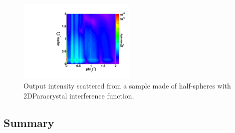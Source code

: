 \begin{figure}[tb]
\begin{center}
\includegraphics[angle=-90,width=0.5\textwidth]{fig/gisasmap/HSphere_2DDL.pdf}
\end{center}
\caption{Output intensity scattered from a sample made of half-spheres with 2DParacrystal interference function.}
\label{fig:2ddl}
\end{figure}

\FloatBarrier


\subsection{Summary}

